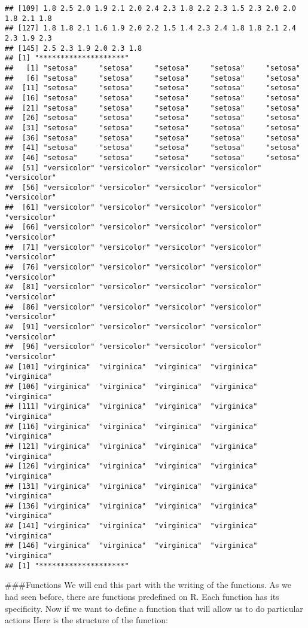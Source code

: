 \documentclass[
]{article}
\begin{document}
\begin{verbatim}
## [109] 1.8 2.5 2.0 1.9 2.1 2.0 2.4 2.3 1.8 2.2 2.3 1.5 2.3 2.0 2.0 1.8 2.1 1.8
## [127] 1.8 1.8 2.1 1.6 1.9 2.0 2.2 1.5 1.4 2.3 2.4 1.8 1.8 2.1 2.4 2.3 1.9 2.3
## [145] 2.5 2.3 1.9 2.0 2.3 1.8
## [1] "********************"
##   [1] "setosa"     "setosa"     "setosa"     "setosa"     "setosa"    
##   [6] "setosa"     "setosa"     "setosa"     "setosa"     "setosa"    
##  [11] "setosa"     "setosa"     "setosa"     "setosa"     "setosa"    
##  [16] "setosa"     "setosa"     "setosa"     "setosa"     "setosa"    
##  [21] "setosa"     "setosa"     "setosa"     "setosa"     "setosa"    
##  [26] "setosa"     "setosa"     "setosa"     "setosa"     "setosa"    
##  [31] "setosa"     "setosa"     "setosa"     "setosa"     "setosa"    
##  [36] "setosa"     "setosa"     "setosa"     "setosa"     "setosa"    
##  [41] "setosa"     "setosa"     "setosa"     "setosa"     "setosa"    
##  [46] "setosa"     "setosa"     "setosa"     "setosa"     "setosa"    
##  [51] "versicolor" "versicolor" "versicolor" "versicolor" "versicolor"
##  [56] "versicolor" "versicolor" "versicolor" "versicolor" "versicolor"
##  [61] "versicolor" "versicolor" "versicolor" "versicolor" "versicolor"
##  [66] "versicolor" "versicolor" "versicolor" "versicolor" "versicolor"
##  [71] "versicolor" "versicolor" "versicolor" "versicolor" "versicolor"
##  [76] "versicolor" "versicolor" "versicolor" "versicolor" "versicolor"
##  [81] "versicolor" "versicolor" "versicolor" "versicolor" "versicolor"
##  [86] "versicolor" "versicolor" "versicolor" "versicolor" "versicolor"
##  [91] "versicolor" "versicolor" "versicolor" "versicolor" "versicolor"
##  [96] "versicolor" "versicolor" "versicolor" "versicolor" "versicolor"
## [101] "virginica"  "virginica"  "virginica"  "virginica"  "virginica" 
## [106] "virginica"  "virginica"  "virginica"  "virginica"  "virginica" 
## [111] "virginica"  "virginica"  "virginica"  "virginica"  "virginica" 
## [116] "virginica"  "virginica"  "virginica"  "virginica"  "virginica" 
## [121] "virginica"  "virginica"  "virginica"  "virginica"  "virginica" 
## [126] "virginica"  "virginica"  "virginica"  "virginica"  "virginica" 
## [131] "virginica"  "virginica"  "virginica"  "virginica"  "virginica" 
## [136] "virginica"  "virginica"  "virginica"  "virginica"  "virginica" 
## [141] "virginica"  "virginica"  "virginica"  "virginica"  "virginica" 
## [146] "virginica"  "virginica"  "virginica"  "virginica"  "virginica" 
## [1] "********************"
\end{verbatim}

\#\#\#Functions We will end this part with the writing of the functions.
As we had seen before, there are functions predefined on R. Each
function has its specificity. Now if we want to define a function that
will allow us to do particular actions Here is the structure of the
function:
\end{document}
